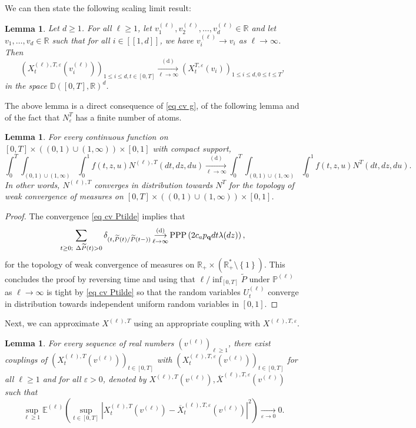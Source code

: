 \documentclass[11pt]{article}
\newtheorem{lemma}[theorem]{Lemma}
\numberwithin{equation}{section}
\def\vp{\varepsilon}
\def \R{\mathbb {R}}
\def\E{\mathbb{E}}
\def\P{\mathbb{P}}
\def\lb{[\![}
\def\rb{]\!]}
\begin{document}
We can then state the following scaling limit result:
\begin{lemma}\label{lemme cv du flot tronque}
Let $d \ge 1$. For all $\ell \ge1$, let $v_1^{(\ell)}, v_2^{(\ell)}, \ldots, v_d^{(\ell)}\in \R$ and let $v_1, \ldots, v_d \in \R$ such that for all $i \in \lb 1, d \rb$, we have 
$
v^{(\ell)}_i \longrightarrow v_i
$ as $\ell \to \infty$. 
Then 
$$
\left(X^{(\ell),T,\vp}_t(v^{(\ell)}_i)\right)_{1 \le i \le d, t \in [0,T]}
\mathop{\longrightarrow}\limits_{\ell \to \infty}^{(\mathrm{d})}
(X^{T,\vp}_t(v_i))_{1 \le i \le d, 0 \le t \le T},
$$
in the space $\mathbb{D}([0,T],\R)^d$.
\end{lemma}
The above lemma is a direct consequence of \eqref{eq cv g}, of the following lemma and of the fact that $N^T_\vp$ has a finite number of atoms.
\begin{lemma}\label{lemme cv ppp}
		For every continuous function on $[0,T] \times ((0,1)\cup (1,\infty)) \times [0,1]$ with compact support, 
		$$
		\int_0^T\int_{(0,1)\cup (1,\infty)} \int_0^1 f(t,z,u)N^{(\ell),T}(dt,dz,du) \mathop{\longrightarrow}\limits_{\ell \to \infty}^{(\mathrm{d})}
		\int_0^T\int_{(0,1)\cup (1,\infty)} \int_0^1
		f(t,z,u)
		N^{T}(dt,dz,du).
		$$
		In other words, $N^{(\ell),T}$ converges in distribution towards $N^T$ for the topology of weak convergence of measures on $[0,T] \times ((0,1)\cup (1,\infty)) \times [0,1]$.
\end{lemma}
\begin{proof}
The convergence \eqref{eq cv Ptilde} implies that 
$$
\sum_{t\ge 0; \ \Delta \widetilde{P}(t)>0} \delta_{(t,\widetilde{P}(t)/\widetilde{P}(t-))} 
\mathop{\longrightarrow}\limits_{\ell \to \infty}^{(\mathrm{d})}
\mathrm{PPP}\left(2 c_a p_{\bf q}dt  \lambda(dz)\right),
$$
for the topology of weak convergence of measures on $\R_+ \times (\R_+^*\setminus \left\{1\right\})$. This concludes the proof by reversing time and using that $\ell/\inf_{[0,T]} \widetilde{P}$ under $\P^{(\ell)}$ as $\ell \to \infty$ is tight by \eqref{eq cv Ptilde} so that the random variables $U^{(\ell)}_t$ converge in distribution towards independent uniform random variables in $[0,1]$. 
\end{proof}

Next, we can approximate $X^{(\ell),T}$ using an appropriate coupling with $X^{(\ell),T,\vp}$.
\begin{lemma}\label{lemme couplage}
For every sequence of real numbers $(v^{(\ell)})_{\ell \ge 1}$, there exist couplings of $(X^{(\ell),T}_t(v^{(\ell)}))_{t \in [0,T]}$ with $(X^{(\ell),T,\vp}_t(v^{(\ell)}))_{t \in [0,T]}$ for all $\ell \ge 1$ and for all $\vp >0$, denoted by $X^{(\ell),T}(v^{(\ell)}),\overline{X}^{(\ell),T,\vp}(v^{(\ell)})$ such that
$$
\sup_{\ell \ge 1} \E^{(\ell)} 
\left(\sup_{t\in [0,T]} 
\left|
X^{(\ell),T}_t(v^{(\ell)})
-
\overline{X}^{(\ell),T,\vp}_t(v^{(\ell)})
\right|^2
\right)
\mathop{\longrightarrow}\limits_{\vp \to 0} 0.
$$
\end{lemma}
\end{document}
